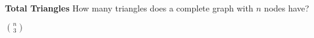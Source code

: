\question \textbf{Total Triangles}\newline
How many triangles does a complete graph with $n$ nodes have?
\begin{solution}
${n \choose 3}$
\end{solution}